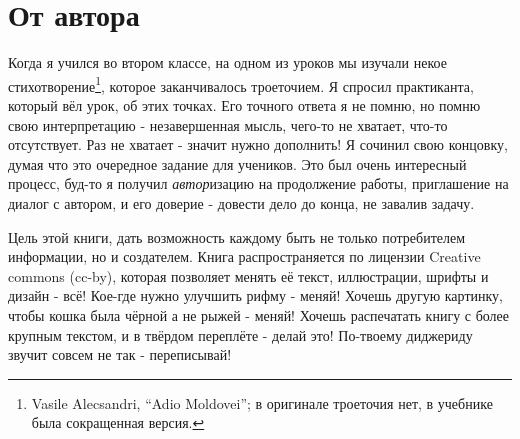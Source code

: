\documentclass[a5paper,11pt]{memoir}
\begin{document}
\BgThispage

\section{От автора}
\small{
Когда я учился во втором классе, на одном из уроков мы изучали некое стихотворение\footnote{Vasile Alecsandri, ``Adio Moldovei''; в оригинале троеточия нет, в учебнике была сокращенная версия.}, которое заканчивалось троеточием. Я спросил практиканта, который вёл урок, об этих точках. Его точного ответа я не помню, но помню свою интерпретацию - незавершенная мысль, чего-то не хватает, что-то отсутствует. Раз не хватает - значит нужно дополнить! Я сочинил свою концовку, думая что это очередное задание для учеников. Это был очень интересный процесс, буд-то я получил \textit{автор}изацию на продолжение работы, приглашение на диалог с автором, и его доверие - довести дело до конца, не завалив задачу.


Цель этой книги, дать возможность каждому быть не только потребителем информации, но и создателем. Книга распространяется по лицензии Creative commons (cc-by), которая позволяет менять её текст, иллюстрации, шрифты и дизайн - всё! Кое-где нужно улучшить рифму - меняй! Хочешь другую картинку, чтобы кошка была чёрной а не рыжей - меняй! Хочешь распечатать книгу с более крупным текстом, и в твёрдом переплёте - делай это! По-твоему диджериду звучит совсем не так - переписывай!
}
\newpage
\end{document}
